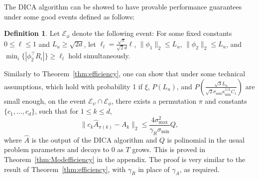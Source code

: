 \documentclass[jmlr]{article}
\newcommand{\Epsi}{\mathcal{E}_{\psi}}
\newcommand{\Ephi}{\mathcal{E}_{\phi}}
\theoremstyle{definition}
\newtheorem{definition}[lemma]{Definition}
\begin{document}
The DICA algorithm can be showed to have provable performance guarantees under some good events defined as follows:
\begin{definition}
Let $\Ephi$ denote the following event:
For some fixed constants $0\le \ell\le 1$ and $L_u \ge \sqrt{2d}$, let $\ell_l = \frac{\sqrt{\pi}}{\sqrt{2}d}\ell$,
$\|\phi_1\|_2 \le L_u$, $\|\phi_2\|_2 \le L_u$, and $\min_i \{|\phi_2^{\top}R_i|\} \ge \ell_l$ hold simultaneously.
\end{definition}  
Similarly to Theorem~\ref{thm:efficiency}, one can show that under some technical assumptions, which 
hold with probability 1 if $\xi$, $P(L_u)$, and $P\left(\frac{\sqrt{3}L_u}{\sqrt{2}\sigma_{\min}\kappa_{\min}^{1/2}C_1}\right)$  are small enough,
on the event $\Epsi \cap\Ephi$,  there exists a permutation $\pi$ and constants $\{c_1,\ldots,c_d\}$, such that for $1\le k\le d$,
\[
\| c_k\hat{A}_{\pi(k)} - A_k\|_2 \le \frac{4\sigma^2_{\max}}{\gamma_R\sigma_{\min}} Q,
\]
where $\hat{A}$ is the output of the DICA algorithm and $Q$ is polinomial in the usual problem parameters and decays to 0 as $T$ grows. %
This is proved in Theorem~\ref{thm:Modefficiency} in the appendix.
The proof is very similar to the result of Theorem~\ref{thm:efficiency}, with $\gamma_R$ in place of $\gamma_A$, as required.
\end{document}
